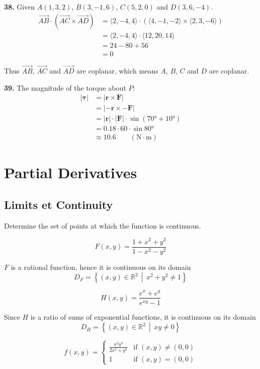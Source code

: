 \documentclass[a4paper,12pt]{article}
\newcommand{\exercise}[1]{\noindent\textbf{#1.}}
\begin{document}
\exercise{38} Given $A(1, 3, 2)$, $B(3, -1, 6)$, $C(5, 2, 0)$ and $D(3, 6, -4)$.
\begin{align*}
   \overrightarrow{AB}\cdot
   \left(\overrightarrow{AC}\times\overrightarrow{AD}\right)
&= \langle 2, -4, 4 \rangle \cdot
   (\langle 4, -1, -2 \rangle \times \langle 2, 3, -6 \rangle)\\
&= \langle 2, -4, 4 \rangle \cdot \langle 12, 20, 14 \rangle\\
&= 24 - 80 + 56\\
&= 0
\end{align*}

Thus $\overrightarrow{AB}$, $\overrightarrow{AC}$ and $\overrightarrow{AD}$
are coplanar, which means $A$, $B$, $C$ and $D$ are coplanar.

\exercise{39} The magnitude of the torque about $P$:
\begin{align*}
   |\boldsymbol\tau|
&= |\mathbf{r}\times\mathbf{F}|\\
&= |-\mathbf{r}\times-\mathbf{F}|\\
&= |\mathbf{r}|\cdot|\mathbf{F}|\cdot\sin\left(\ang{70}+\ang{10}\right)\\
&= 0.18 \cdot 60 \cdot \sin\ang{80}\\
&\approx 10.6\qquad(\mathrm{N}\cdot\mathrm{m})
\end{align*}

\setcounter{section}{13}
\section{Partial Derivatives}
\setcounter{subsection}{1}
\subsection{Limits et Continuity}
Determine the set of points at which the function is continuous.

\[F(x, y) = \frac{1 + x^2 + y^2}{1 - x^2 - y^2}\tag{31}\]

$F$ is a rational function, hence it is continuous on its domain
\[D_F = \left\{(x, y) \in \mathbb{R}^2 \,\middle|\, x^2 + y^2 \neq 1\right\}\]

\[H(x, y) = \frac{e^x + e^y}{e^{xy} - 1}\tag{32}\]

Since $H$ is a ratio of sums of exponential functions, it is continuous on its
domain \[D_H = \left\{(x, y) \in \mathbb{R}^2 \,\middle|\, xy \neq 0\right\}\]

\[f(x, y) = \begin{cases}
            \frac{x^2 y^3}{2x^2 + y^2}&\text{if }(x, y) \neq (0, 0)\\
            1&\text{if }(x, y) = (0, 0)
\end{cases}\tag{37}\]
\end{document}
